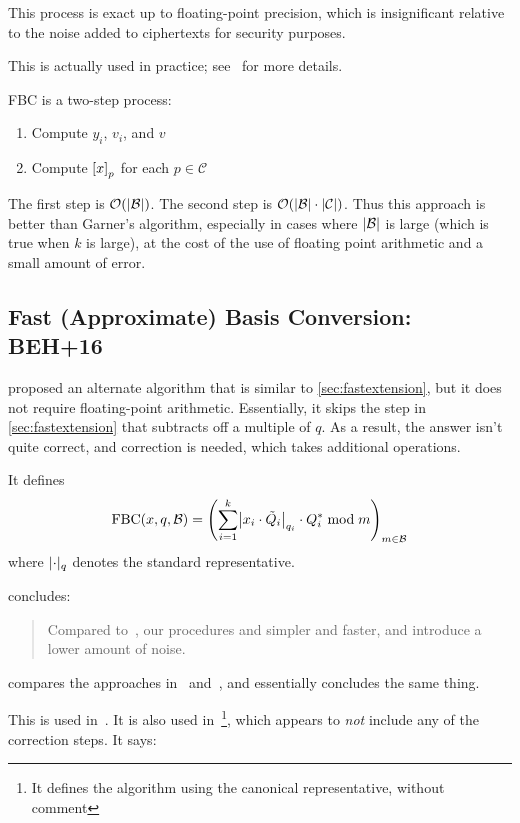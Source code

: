 \documentclass[../../fheimpl.tex]{subfiles}
\begin{document}
This process is exact up to floating-point precision, which is insignificant relative to the noise added to ciphertexts for security purposes.

This is actually used in practice; see~\cite{cryptoeprint:2018/589} for more details.

FBC is a two-step process:
\begin{enumerate}
	\item Compute $y_i$, $v_i$, and $v$
	\item Compute $\bracks*{x}_p$ for each $p\in \mathcal{C}$
\end{enumerate}
The first step is $\mathcal{O}(\abs{\mathcal{B}})$. The second step is $\mathcal{O}(\abs{\mathcal{B}}\cdot \abs{\mathcal{C}})$. Thus this approach is better than Garner's algorithm, especially in cases where $\abs{\mathcal{B}}$ is large (which is true when $k$ is large), at the cost of the use of floating point arithmetic and a small amount of error.

\subsection{Fast (Approximate) Basis Conversion: BEH+16}
\label{sec:basisExtErr}
\cite{cryptoeprint:2016/510} proposed an alternate algorithm that is similar to \cref{sec:fastextension}, but it does not require floating-point arithmetic. Essentially, it skips the step in \cref{sec:fastextension} that subtracts off a multiple of $q$. As a result, the answer isn't quite correct, and correction is needed, which takes additional operations.

It defines
\[\mathrm{FBC}(x,q,\mathcal{B}) = \parens*{
	\sum_{i=1}^k \abs*{x_i\cdot \tilde{Q}_i}_{q_i}\cdot Q_i^*\bmod m}_{m\in\mathcal{B}}\]
where $\abs{\cdot}_q$ denotes the standard representative.

\cite{cryptoeprint:2018/117} concludes:

\blockquote{Compared to~\cite{cryptoeprint:2016/510}, our procedures and simpler and faster, and introduce a lower amount of noise.}

\cite{cryptoeprint:2018/589} compares the approaches in~\cite{cryptoeprint:2016/510} and~\cite{cryptoeprint:2018/117}, and essentially concludes the same thing.

This is used in~\cite{cryptoeprint:2018/931}. It is also used in~\cite{cryptoeprint:2019/688}\footnote{It defines the algorithm using the canonical representative, without comment}, which appears to \emph{not} include any of the correction steps. It says:
\end{document}
